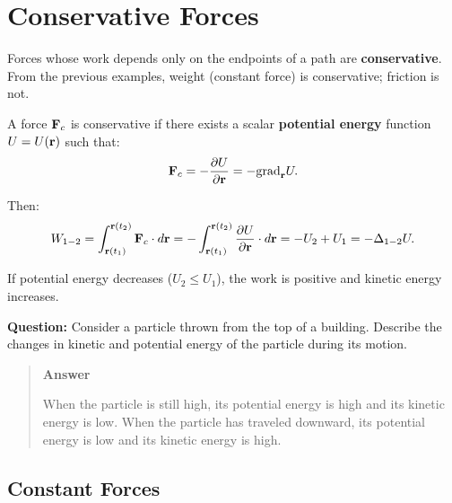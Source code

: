 \documentclass[
  letterpaper,
  DIV=11,
  numbers=noendperiod]{scrreprt}
\begin{document}
\section{Conservative Forces}\label{conservative-forces}

Forces whose work depends only on the endpoints of a path are
\textbf{conservative}. From the previous examples, weight (constant
force) is conservative; friction is not.

A force \({\bf F}_c\) is conservative if there exists a scalar
\textbf{potential energy} function \(U = U({\bf r})\) such that:
\begin{align}
    {\bf F}_c = -\frac{\partial U}{\partial {\bf r}} = -\text{grad}_{\bf r}U.
\end{align}

Then: \begin{align}
    W_{1-2} = \int_{{\bf r}(t_1)}^{{\bf r}(t_2)}{\bf F}_c\cdot d{\bf r} = -\int_{{\bf r}(t_1)}^{{\bf r}(t_2)}\frac{\partial U}{\partial {\bf r}}\cdot d{\bf r} = -U_2+U_1 = -\Delta_{1-2}U.
\end{align}

If potential energy decreases (\(U_2 \leq U_1\)), the work is positive
and kinetic energy increases.

\begin{tcolorbox}[enhanced jigsaw, arc=.35mm, bottomrule=.15mm, bottomtitle=1mm, breakable, colback=white, colbacktitle=quarto-callout-tip-color!10!white, colframe=quarto-callout-tip-color-frame, coltitle=black, left=2mm, leftrule=.75mm, opacityback=0, opacitybacktitle=0.6, rightrule=.15mm, title=\textcolor{quarto-callout-tip-color}{\faLightbulb}\hspace{0.5em}{Think!}, titlerule=0mm, toprule=.15mm, toptitle=1mm]

\textbf{Question:} Consider a particle thrown from the top of a
building. Describe the changes in kinetic and potential energy of the
particle during its motion.

\begin{quote}
\textbf{Answer}

When the particle is still high, its potential energy is high and its
kinetic energy is low. When the particle has traveled downward, its
potential energy is low and its kinetic energy is high.
\end{quote}

\end{tcolorbox}

\subsection{Constant Forces}\label{constant-forces}
\end{document}
